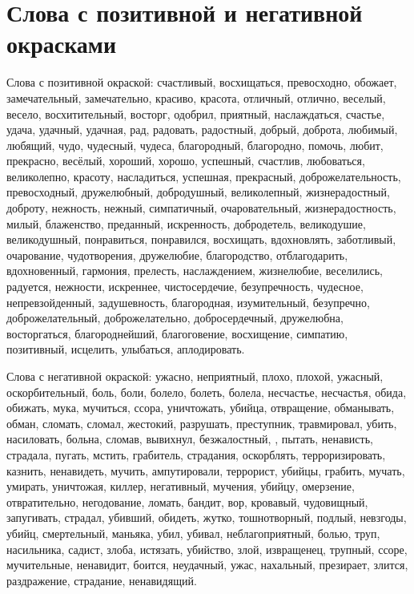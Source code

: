 \chapter{Слова с позитивной и негативной окрасками}
Слова с позитивной окраской: счастливый, восхищаться, превосходно, обожает,
замечательный, замечательно, красиво, красота, отличный, отлично, веселый,
весело, восхитительный, восторг, одобрил, приятный, наслаждаться, счастье,
удача,
удачный, удачная, рад, радовать, радостный, добрый, доброта, любимый, любящий,
чудо, чудесный, чудеса, благородный, благородно, помочь, любит, прекрасно,
весёлый, хороший, хорошо, успешный, счастлив, любоваться, великолепно, красоту,
насладиться, успешная, прекрасный, доброжелательность, превосходный,
дружелюбный, добродушный, великолепный, жизнерадостный, доброту, нежность,
нежный,
симпатичный, очаровательный, жизнерадостность, милый, блаженство, преданный,
искренность, добродетель, великодушие, великодушный, понравиться, понравился,
восхищать, вдохновлять, заботливый, очарование, чудотворения, дружелюбие,
благородство, отблагодарить, вдохновенный, гармония, прелесть, наслаждением,
жизнелюбие, веселились, радуется, нежности, искреннее, чистосердечие,
безупречность,
чудесное, непревзойденный, задушевность, благородная, изумительный, безупречно,
доброжелательный, доброжелательно, добросердечный, дружелюбна, восторгаться,
благороднейший, благоговение, восхищение, симпатию, позитивный, исцелить,
улыбаться, аплодировать.

Слова с негативной окраской: ужасно, неприятный, плохо, плохой, ужасный,
оскорбительный, боль, боли, болело, болеть, болела, несчастье, несчастья, обида,
обижать, мука, мучиться, ссора, уничтожать, убийца, отвращение, обманывать,
обман, сломать, сломал, жестокий, разрушать, преступник, травмировал, убить,
насиловать, больна, сломав, вывихнул, безжалостный, , пытать, ненависть,
страдала,
пугать, мстить, грабитель, страдания, оскорблять, терроризировать, казнить,
ненавидеть, мучить, ампутировали, террорист, убийцы, грабить, мучать, умирать,
уничтожая, киллер, негативный, мучения, убийцу, омерзение, отвратительно,
негодование, ломать, бандит, вор, кровавый, чудовищный, запугивать, страдал,
убивший, обидеть, жутко, тошнотворный, подлый, невзгоды, убийц, смертельный,
маньяка, убил,
убивал, неблагоприятный, болью, труп, насильника, садист, злоба, истязать,
убийство, злой, извращенец, трупный, ссоре, мучительные, ненавидит, боится,
неудачный,
ужас, нахальный, презирает, злится, раздражение, страдание, ненавидящий.

\FloatBarrier

